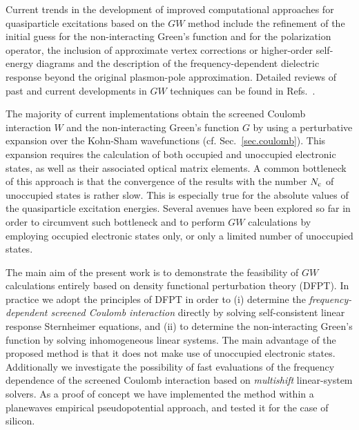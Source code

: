 \documentclass[twocolumn,prb,showpacs,superscriptaddress]{revtex4}
\begin{document}
Current trends in the development of improved computational approaches for
quasiparticle excitations based on the $GW$ method include the refinement
of the initial guess for the non-interacting Green's function and for the
polarization operator,\cite{rinke,schilfegarde}
the inclusion of approximate vertex corrections or higher-order self-energy
diagrams\cite{york} and the description of the frequency-dependent
dielectric response beyond the original plasmon-pole approximation.\cite{spacetime,blochl}
Detailed reviews of past and current developments in $GW$ techniques can be
found in Refs.\ .

The majority of current implementations obtain the screened Coulomb interaction
$W$ and the non-interacting Green's function $G$ by using a perturbative
expansion over the Kohn-Sham wavefunctions (cf. Sec.\ \ref{sec.coulomb}). This expansion
requires the calculation of both occupied and unoccupied electronic states,
as well as their associated optical matrix elements.\cite{hl86} A common bottleneck 
of this approach is that the convergence of the results with the number $N_{\rm c}$ 
of unoccupied states is rather slow.\cite{sohrab} This is especially true for
the absolute values of the quasiparticle excitation energies.\cite{bruneval-gonze}
%
Several avenues have been explored so far in order to circumvent such bottleneck 
and to perform $GW$ calculations by employing occupied electronic states only,\cite{reining-sternheimer,umari1,umari2,gygi}
or only a limited number of unoccupied states.\cite{bruneval-gonze}


The main aim of the present work is to demonstrate the feasibility of $GW$ calculations
entirely based on density functional perturbation theory (DFPT).\cite{baroni.rmp}
In practice we adopt the principles of DFPT in order to (i) determine 
the {\it frequency-dependent screened Coulomb interaction} directly
by solving self-consistent linear response Sternheimer equations,
and (ii) to determine the non-interacting Green's function by solving
inhomogeneous linear systems. The main advantage of the proposed method 
is that it does not make use of unoccupied electronic states.
Additionally we investigate the possibility of fast evaluations of 
the frequency dependence of the screened Coulomb interaction
based on {\it multishift} linear-system solvers.\cite{frommer}
%
As a proof of concept we have implemented the method within
a planewaves empirical pseudopotential approach,\cite{cohen_berg} 
and tested it for the case of silicon.
\end{document}
